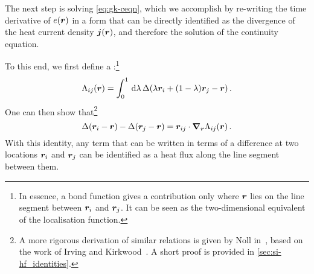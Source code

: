 The next step is solving \cref{eq:gk-ceqn}, which we accomplish by re-writing the time derivative of $e(\boldsymbol{r})$ in a form that can be directly identified as the divergence of the heat current density $\boldsymbol{j}(\boldsymbol{r})$, and therefore the solution of the continuity equation.

\noindent
To this end, we first define a :\footnote{In essence, a bond function gives a contribution only where $\boldsymbol{r}$ lies on the line segment between $\boldsymbol{r}_i$ and $\boldsymbol{r}_j$. It can be seen as the two-dimensional equivalent of the localisation function.}
\begin{equation}
	\Lambda_{ij}(\boldsymbol{r}) = \int_0^1 \, \text{d} \lambda\, \Delta(\lambda \boldsymbol{r}_i + (1-\lambda) \boldsymbol{r}_j - \boldsymbol{r}) \, .
\end{equation}
One can then show that\footnote[][2\baselineskip]{A more rigorous derivation of similar relations is given by Noll in~\cite{n1955t}, based on the work of Irving and Kirkwood~\cite{ik1950t}. A short proof is provided in \cref{sec:si-hf_identities}.}
\begin{equation}
	\localf{\R_i - \R} - \localf{\R_j - \R} = \R_{ij} \cdot \grad_{\R} \bondf{ij}{\R} \, . \label{eq:hf_bondf_identity}
\end{equation}
With this identity, any term that can be written in terms of a difference at two locations $\boldsymbol{r}_i$ and $\boldsymbol{r}_j$ can be identified as a heat flux along the line segment between them.

